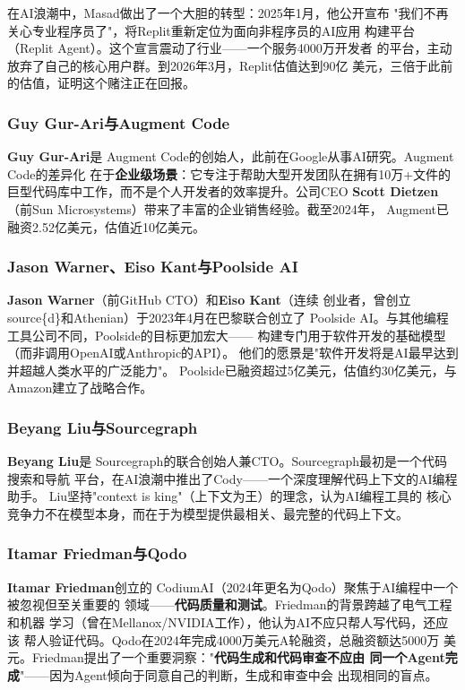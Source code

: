 在AI浪潮中，Masad做出了一个大胆的转型：2025年1月，他公开宣布
"我们不再关心专业程序员了"，将Replit重新定位为面向非程序员的AI应用
构建平台（Replit Agent）。这个宣言震动了行业——一个服务4000万开发者
的平台，主动放弃了自己的核心用户群。到2026年3月，Replit估值达到90亿
美元，三倍于此前的估值，证明这个赌注正在回报。

\subsubsection{Guy Gur-Ari与Augment Code} \textbf{Guy Gur-Ari}是
Augment Code的创始人，此前在Google从事AI研究。Augment Code的差异化
在于\textbf{企业级场景}：它专注于帮助大型开发团队在拥有10万+文件的
巨型代码库中工作，而不是个人开发者的效率提升。公司CEO \textbf{Scott
Dietzen}（前Sun Microsystems）带来了丰富的企业销售经验。截至2024年，
Augment已融资2.52亿美元，估值近10亿美元。

\subsubsection{Jason Warner、Eiso Kant与Poolside AI}
\textbf{Jason Warner}（前GitHub CTO）和\textbf{Eiso Kant}（连续
创业者，曾创立source\{d\}和Athenian）于2023年4月在巴黎联合创立了
Poolside AI。与其他编程工具公司不同，Poolside的目标更加宏大——
构建专门用于软件开发的基础模型（而非调用OpenAI或Anthropic的API）。
他们的愿景是"软件开发将是AI最早达到并超越人类水平的广泛能力"。
Poolside已融资超过5亿美元，估值约30亿美元，与Amazon建立了战略合作。

\subsubsection{Beyang Liu与Sourcegraph} \textbf{Beyang Liu}是
Sourcegraph的联合创始人兼CTO。Sourcegraph最初是一个代码搜索和导航
平台，在AI浪潮中推出了Cody——一个深度理解代码上下文的AI编程助手。
Liu坚持"context is king"（上下文为王）的理念，认为AI编程工具的
核心竞争力不在模型本身，而在于为模型提供最相关、最完整的代码上下文。

\subsubsection{Itamar Friedman与Qodo} \textbf{Itamar Friedman}创立的
CodiumAI（2024年更名为Qodo）聚焦于AI编程中一个被忽视但至关重要的
领域——\textbf{代码质量和测试}。Friedman的背景跨越了电气工程和机器
学习（曾在Mellanox/NVIDIA工作），他认为AI不应只帮人写代码，还应该
帮人验证代码。Qodo在2024年完成4000万美元A轮融资，总融资额达5000万
美元。Friedman提出了一个重要洞察："\textbf{代码生成和代码审查不应由
同一个Agent完成}"——因为Agent倾向于同意自己的判断，生成和审查中会
出现相同的盲点。

